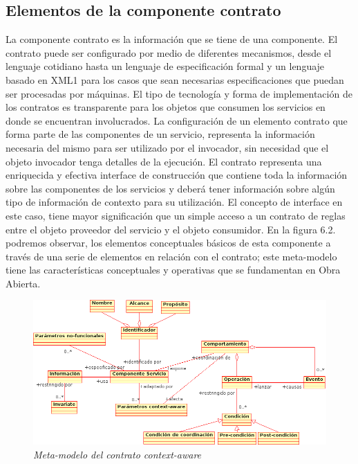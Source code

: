 \documentclass[12 pt,a4paper]{llncs}
\begin{document}
\subsection {Elementos de la componente contrato}

La componente contrato es la información que se tiene de una componente. El contrato puede ser configurado por medio de diferentes mecanismos, desde el lenguaje cotidiano hasta un lenguaje de especificación formal y un lenguaje basado en XML1 para los casos que sean necesarias especificaciones que puedan ser procesadas por máquinas. 
El tipo de tecnología y forma de implementación de los contratos es transparente para los objetos que consumen los servicios en donde se encuentran involucrados.
La configuración de un elemento contrato que forma parte de  las componentes de un servicio, representa la información necesaria del mismo para ser utilizado por el invocador, sin necesidad que el objeto invocador tenga detalles de la ejecución.
El contrato representa una enriquecida y efectiva interface de construcción que contiene toda la información sobre las componentes de los servicios y deberá tener información sobre algún tipo de información de contexto para su utilización.
El concepto de interface en este caso, tiene mayor significación que un simple acceso a un contrato de reglas entre el objeto proveedor del servicio y el objeto consumidor.
En la figura 6.2. podremos observar, los elementos conceptuales básicos de esta componente a través de una serie de elementos en relación con el contrato; este meta-modelo tiene las características conceptuales y operativas que se fundamentan en Obra Abierta. 

\begin{figure}[!h]
\begin{center}
		\includegraphics[width=5in,totalheight=2in]{contratoca.png}
                \caption{\small \sl Meta-modelo del contrato context-aware} \label{contratoca}
\end{center}
\end{figure}
 
\end{document}
